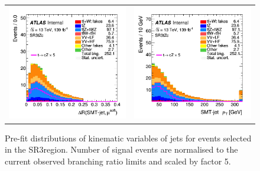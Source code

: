 \begin{figure}[htbp]
\begin{tabular}{cc}
		\includegraphics[width=.45\textwidth]{Chapters/CH6/figures/SR3_UsingSMT/softmu_dRmin} &
		\includegraphics[width=.45\textwidth]{Chapters/CH6/figures/SR3_UsingSMT/SMTjet_Pt} \\
	\end{tabular}
	\caption{Pre-fit distributions of kinematic variables of jets for events selected in the SR3\tZc region. Number of signal events are normalised to the current observed branching ratio limits and scaled by factor 5. 
		\ErrStatOnly
		\Blinded
	}%
	\label{fig:sr3_kin_jet}
\end{figure}
\newpage
